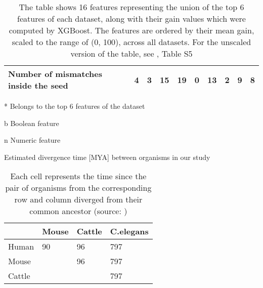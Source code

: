 \documentclass{bmcart}
\begin{document}
\begin{backmatter}
\begin{table}[h!]
\begin{threeparttable}
\begin{tabular}{|l|l|l|l|l|l|l|l|l|l|}
\textbf{Number of mismatches inside the seed\tnote{n}}    & 4            & 3            & 15           & 19\tnote{*}          & 0           & 13          & 2           & 9           & 8             \\ \hline
\end{tabular}
\begin{tablenotes}\footnotesize
\item[*] Belongs to the top 6 features of the dataset
\item[b] Boolean feature
\item[n] Numeric feature

\end{tablenotes}
 \end{threeparttable}
 \caption*{The table shows 16 features representing the union of the top 6 features of each dataset, along with their gain values which were computed by XGBoost. The features are ordered by their mean gain, scaled to the range of (0, 100), across all datasets. For the unscaled version of the table, see , Table S5}
\end{table}


\begin{table}[h!]
\caption{Estimated divergence time {[}MYA{]} between organisms in our study}
\label{tab:evolutiontime}
\begin{tabular}{|l|l|l|l|}
\hline
             & Mouse & Cattle & C.elegans \\ \hline
Human & 90  & 96         & 797                    \\ \hline
Mouse          &     & 96         & 797                    \\ \hline
Cattle   &     &            & 797                    \\ \hline
\end{tabular}
\caption*{Each cell represents the time since the pair of organisms from the corresponding row and column diverged from their common ancestor (source: \cite{kumar2017timetree})}
\end{table}



\end{backmatter}
\end{document}
